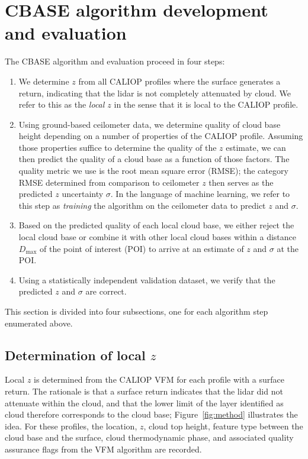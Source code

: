\documentclass[essd,manuscript]{copernicus}\usepackage[]{graphicx}\usepackage[]{color}
\newcommand\CBH{\ensuremath{z}}
\begin{document}
\section{CBASE algorithm development and evaluation}
\label{sec:algorithm}

The CBASE algorithm and evaluation proceed in four steps:
\begin{enumerate}
\item We determine \CBH{} from all CALIOP profiles where the
  surface generates a return, indicating that the lidar is not completely
  attenuated by cloud.  We refer to this as the \textit{local
    \CBH{}} in the sense that it is local to the CALIOP profile.
\item Using ground-based ceilometer data, we determine quality of cloud base
  height depending on a number of properties of the CALIOP profile.  Assuming
  those properties suffice to determine the quality of the \CBH{} estimate, we
  can then predict the quality of a cloud base as a function of those factors.
  The quality metric we use is the root mean square error (RMSE); the category
  RMSE determined from comparison to ceilometer \CBH{} then serves as the predicted
  \CBH{} uncertainty $\sigma$.  In the language of machine learning, we refer to this step
  as \textit{training} the algorithm on the ceilometer data to predict \CBH{} and
  $\sigma$.
\item Based on the predicted quality of each local cloud base, we either reject
  the local cloud base or combine it with other local cloud bases within a
  distance $D_\text{max}$ of the point of interest (POI) to arrive at an 
  estimate of \CBH{} and $\sigma$ at the POI.
\item Using a statistically independent validation dataset, we verify that the
  predicted \CBH{} and $\sigma$ are correct.
\end{enumerate}

This section is divided into four subsections, one for each algorithm step
enumerated above.

\subsection{Determination of local \CBH{}}
\label{sec:algorithm:local}
Local \CBH{} is determined from the CALIOP VFM for each profile with a surface
return.  The rationale is that a surface return indicates that the lidar did not
attenuate within the cloud, and that the lower limit of the layer identified as
cloud therefore corresponds to the cloud base; Figure~\ref{fig:method}
illustrates the idea.  For these profiles, the location, \CBH{}, cloud top height,
feature type between the cloud base and the surface,
cloud thermodynamic phase, and associated quality assurance flags from the VFM
algorithm are recorded.
\end{document}

